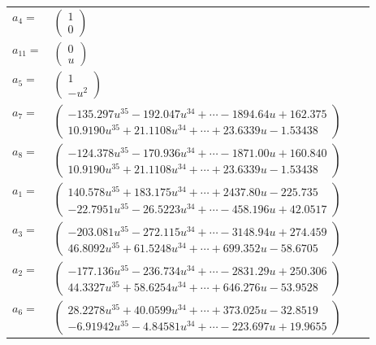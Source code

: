\documentclass[1p]{elsarticle_modified}
\theoremstyle{definition}
\begin{document}
\begin{tabular}{m{7pt} m{180pt} m{7pt} m{180pt} }
\flushright $a_{4}=$&$\begin{pmatrix}1\\0\end{pmatrix}$ \\
\flushright $a_{11}=$&$\begin{pmatrix}0\\u\end{pmatrix}$ \\
\flushright $a_{5}=$&$\begin{pmatrix}1\\- u^2\end{pmatrix}$ \\
\flushright $a_{7}=$&$\begin{pmatrix}-135.297 u^{35}-192.047 u^{34}+\cdots-1894.64 u+162.375\\10.9190 u^{35}+21.1108 u^{34}+\cdots+23.6339 u-1.53438\end{pmatrix}$ \\
\flushright $a_{8}=$&$\begin{pmatrix}-124.378 u^{35}-170.936 u^{34}+\cdots-1871.00 u+160.840\\10.9190 u^{35}+21.1108 u^{34}+\cdots+23.6339 u-1.53438\end{pmatrix}$ \\
\flushright $a_{1}=$&$\begin{pmatrix}140.578 u^{35}+183.175 u^{34}+\cdots+2437.80 u-225.735\\-22.7951 u^{35}-26.5223 u^{34}+\cdots-458.196 u+42.0517\end{pmatrix}$ \\
\flushright $a_{3}=$&$\begin{pmatrix}-203.081 u^{35}-272.115 u^{34}+\cdots-3148.94 u+274.459\\46.8092 u^{35}+61.5248 u^{34}+\cdots+699.352 u-58.6705\end{pmatrix}$ \\
\flushright $a_{2}=$&$\begin{pmatrix}-177.136 u^{35}-236.734 u^{34}+\cdots-2831.29 u+250.306\\44.3327 u^{35}+58.6254 u^{34}+\cdots+646.276 u-53.9528\end{pmatrix}$ \\
\flushright $a_{6}=$&$\begin{pmatrix}28.2278 u^{35}+40.0599 u^{34}+\cdots+373.025 u-32.8519\\-6.91942 u^{35}-4.84581 u^{34}+\cdots-223.697 u+19.9655\end{pmatrix}$ \\

\end{tabular}
\end{document}
